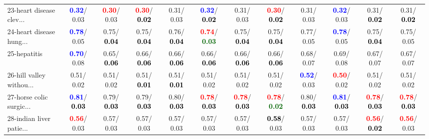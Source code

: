 \begin{table}[h]
\begin{center}
{\begin{tabular}{lc|c|c|c|c|c|c|c|c|c|c}
23-heart disease clev... & \textcolor{blue}{\textbf{  0.32}}/  0.03 & \textcolor{red}{\textbf{  0.30}}/  0.03 & \textcolor{red}{\textbf{  0.30}}/\textcolor{black}{\textbf{  0.02}} &   0.31/  0.03 & \textcolor{blue}{\textbf{  0.32}}/\textcolor{black}{\textbf{  0.02}} &   0.31/  0.03 & \textcolor{red}{\textbf{  0.30}}/\textcolor{black}{\textbf{  0.02}} &   0.31/  0.03 & \textcolor{blue}{\textbf{  0.32}}/  0.03 &   0.31/\textcolor{black}{\textbf{  0.02}} &   0.31/\textcolor{black}{\textbf{  0.02}} \\
24-heart disease hung... & \textcolor{blue}{\textbf{  0.78}}/  0.05 &   0.75/\textcolor{black}{\textbf{  0.04}} &   0.75/\textcolor{black}{\textbf{  0.04}} &   0.76/\textcolor{black}{\textbf{  0.04}} & \textcolor{red}{\textbf{  0.74}}/\textcolor{darkgreen}{\textbf{  0.03}} &   0.75/\textcolor{black}{\textbf{  0.04}} &   0.75/\textcolor{black}{\textbf{  0.04}} &   0.77/  0.05 & \textcolor{blue}{\textbf{  0.78}}/  0.05 &   0.75/\textcolor{black}{\textbf{  0.04}} &   0.75/  0.05 \\
25-hepatitis & \textcolor{blue}{\textbf{  0.70}}/  0.08 &   0.65/\textcolor{black}{\textbf{  0.06}} &   0.66/\textcolor{black}{\textbf{  0.06}} &   0.66/\textcolor{black}{\textbf{  0.06}} &   0.66/\textcolor{black}{\textbf{  0.06}} &   0.66/\textcolor{black}{\textbf{  0.06}} &   0.66/\textcolor{black}{\textbf{  0.06}} &   0.68/  0.07 &   0.69/  0.08 &   0.67/  0.07 &   0.67/  0.07 \\
26-hill valley withou... &   0.51/  0.02 &   0.51/  0.02 &   0.51/\textcolor{black}{\textbf{  0.01}} &   0.51/\textcolor{black}{\textbf{  0.01}} &   0.51/  0.02 &   0.51/  0.02 &   0.51/  0.02 & \textcolor{blue}{\textbf{  0.52}}/  0.03 & \textcolor{red}{\textbf{  0.50}}/  0.02 &   0.51/  0.02 &   0.51/  0.02 \\
27-horse colic surgic... & \textcolor{blue}{\textbf{  0.81}}/\textcolor{black}{\textbf{  0.03}} &   0.79/\textcolor{black}{\textbf{  0.03}} &   0.79/\textcolor{black}{\textbf{  0.03}} &   0.80/\textcolor{black}{\textbf{  0.03}} & \textcolor{red}{\textbf{  0.78}}/\textcolor{black}{\textbf{  0.03}} & \textcolor{red}{\textbf{  0.78}}/\textcolor{black}{\textbf{  0.03}} & \textcolor{red}{\textbf{  0.78}}/\textcolor{darkgreen}{\textbf{  0.02}} &   0.80/\textcolor{black}{\textbf{  0.03}} & \textcolor{blue}{\textbf{  0.81}}/\textcolor{black}{\textbf{  0.03}} & \textcolor{red}{\textbf{  0.78}}/\textcolor{black}{\textbf{  0.03}} & \textcolor{red}{\textbf{  0.78}}/\textcolor{black}{\textbf{  0.03}} \\
28-indian liver patie... & \textcolor{red}{\textbf{  0.56}}/  0.03 &   0.57/  0.03 &   0.57/  0.03 &   0.57/  0.03 &   0.57/  0.03 &   0.57/  0.03 & \textcolor{black}{\textbf{  0.58}}/  0.03 &   0.57/  0.03 &   0.57/  0.03 & \textcolor{red}{\textbf{  0.56}}/\textcolor{black}{\textbf{  0.02}} & \textcolor{red}{\textbf{  0.56}}/  0.03 \\ \hline

\end{tabular}}
\end{center}
\end{table}
